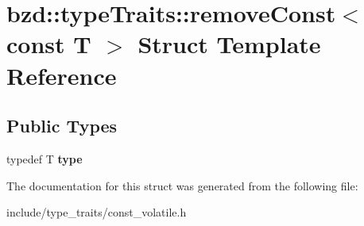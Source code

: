 \hypertarget{structbzd_1_1typeTraits_1_1removeConst_3_01const_01T_01_4}{}\section{bzd\+:\+:type\+Traits\+:\+:remove\+Const$<$ const T $>$ Struct Template Reference}
\label{structbzd_1_1typeTraits_1_1removeConst_3_01const_01T_01_4}
\subsection*{Public Types}
\begin{DoxyCompactItemize}
\item 
\mbox{\label{structbzd_1_1typeTraits_1_1removeConst_3_01const_01T_01_4_af40de163d2476d5f01f29bcec4842c46}} 
typedef T {\bfseries type}
\end{DoxyCompactItemize}


The documentation for this struct was generated from the following file\+:\begin{DoxyCompactItemize}
\item 
include/type\+\_\+traits/const\+\_\+volatile.\+h\end{DoxyCompactItemize}
